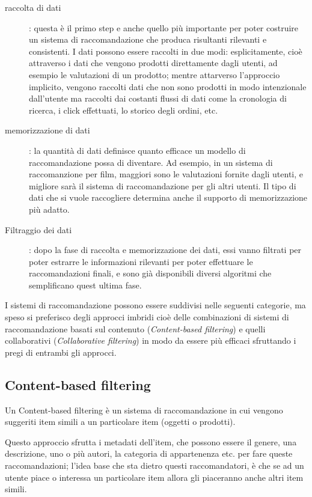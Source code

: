 \begin{description}
	\item[raccolta di dati]: questa è il primo step e anche quello più importante per poter costruire un sistema di 
	raccomandazione che produca risultanti rilevanti e consistenti. I dati possono essere raccolti in due modi: esplicitamente,
	cioè attraverso i dati che vengono prodotti direttamente dagli utenti, ad esempio le valutazioni di un prodotto; mentre 
	attarverso l'approccio implicito, vengono raccolti dati che non sono prodotti in modo intenzionale dall'utente ma raccolti
	dai costanti flussi di dati come la cronologia di ricerca, i click effettuati, lo storico degli ordini, etc.
	\item[memorizzazione di dati]: la quantità di dati definisce quanto efficace un modello di raccomandazione possa di
	diventare. Ad esempio, in un sistema di raccomanzione per film, maggiori sono le valutazioni fornite dagli utenti, e 
	migliore sarà il sistema di raccomandazione per gli altri utenti. Il tipo di dati che si vuole raccogliere determina
	anche il supporto di memorizzazione più adatto.   
	\item[Filtraggio dei dati]: dopo la fase di raccolta e memorizzazione dei dati, essi vanno filtrati per poter estrarre
	le informazioni rilevanti per poter effettuare le raccomandazioni finali, e sono già disponibili diversi algoritmi che
	semplificano quest ultima fase. 
\end{description}

I sistemi di raccomandazione possono essere suddivisi nelle seguenti categorie, ma speso si preferisco degli approcci imbridi cioè delle
combinazioni di sistemi di raccomandazione basati sul contenuto (\textit{Content-based filtering}) e 
quelli collaborativi (\textit{Collaborative filtering}) in modo da essere più efficaci sfruttando i pregi di entrambi gli approcci.


\subsection{Content-based filtering}
Un Content-based filtering è un sistema di raccomandazione in cui vengono suggeriti item simili a un particolare item (oggetti 
o prodotti). 

Questo approccio sfrutta i metadati dell'item, che possono essere il genere, una descrizione, uno o più autori, la categoria di 
appartenenza etc. per fare queste raccomandazioni; l'idea base che sta dietro questi raccomandatori, è che se ad un utente piace 
o interessa un particolare item allora gli piaceranno anche altri item simili.

